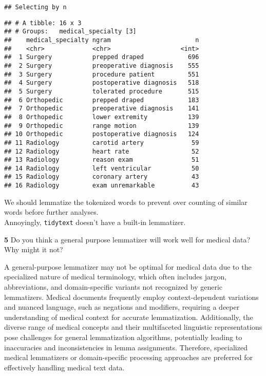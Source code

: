 \documentclass[
]{article}
\begin{document}
\begin{verbatim}
## Selecting by n
\end{verbatim}

\begin{verbatim}
## # A tibble: 16 x 3
## # Groups:   medical_specialty [3]
##    medical_specialty ngram                       n
##    <chr>             <chr>                   <int>
##  1 Surgery           prepped draped            696
##  2 Surgery           preoperative diagnosis    555
##  3 Surgery           procedure patient         551
##  4 Surgery           postoperative diagnosis   518
##  5 Surgery           tolerated procedure       515
##  6 Orthopedic        prepped draped            183
##  7 Orthopedic        preoperative diagnosis    141
##  8 Orthopedic        lower extremity           139
##  9 Orthopedic        range motion              139
## 10 Orthopedic        postoperative diagnosis   124
## 11 Radiology         carotid artery             59
## 12 Radiology         heart rate                 52
## 13 Radiology         reason exam                51
## 14 Radiology         left ventricular           50
## 15 Radiology         coronary artery            43
## 16 Radiology         exam unremarkable          43
\end{verbatim}

We should lemmatize the tokenized words to prevent over counting of
similar words before further analyses.\\
Annoyingly, \texttt{tidytext} doesn't have a built-in lemmatizer.

\textbf{5} Do you think a general purpose lemmatizer will work well for
medical data? Why might it not?

A general-purpose lemmatizer may not be optimal for medical data due to
the specialized nature of medical terminology, which often includes
jargon, abbreviations, and domain-specific variants not recognized by
generic lemmatizers. Medical documents frequently employ
context-dependent variations and nuanced language, such as negations and
modifiers, requiring a deeper understanding of medical context for
accurate lemmatization. Additionally, the diverse range of medical
concepts and their multifaceted linguistic representations pose
challenges for general lemmatization algorithms, potentially leading to
inaccuracies and inconsistencies in lemma assignments. Therefore,
specialized medical lemmatizers or domain-specific processing approaches
are preferred for effectively handling medical text data.
\end{document}
